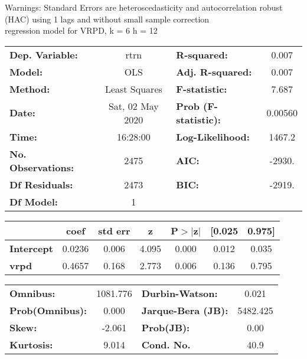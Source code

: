 Warnings: \newline
 [1] Standard Errors are heteroscedasticity and autocorrelation robust (HAC) using 1 lags and without small sample correction\\ 

regression model for VRPD, k = 6 h = 12\begin{center}
\begin{tabular}{lclc}
\toprule
\textbf{Dep. Variable:}    &       rtrn       & \textbf{  R-squared:         } &     0.007   \\
\textbf{Model:}            &       OLS        & \textbf{  Adj. R-squared:    } &     0.007   \\
\textbf{Method:}           &  Least Squares   & \textbf{  F-statistic:       } &     7.687   \\
\textbf{Date:}             & Sat, 02 May 2020 & \textbf{  Prob (F-statistic):} &  0.00560    \\
\textbf{Time:}             &     16:28:00     & \textbf{  Log-Likelihood:    } &    1467.2   \\
\textbf{No. Observations:} &        2475      & \textbf{  AIC:               } &    -2930.   \\
\textbf{Df Residuals:}     &        2473      & \textbf{  BIC:               } &    -2919.   \\
\textbf{Df Model:}         &           1      & \textbf{                     } &             \\
\bottomrule
\end{tabular}
\begin{tabular}{lcccccc}
                   & \textbf{coef} & \textbf{std err} & \textbf{z} & \textbf{P$> |$z$|$} & \textbf{[0.025} & \textbf{0.975]}  \\
\midrule
\textbf{Intercept} &       0.0236  &        0.006     &     4.095  &         0.000        &        0.012    &        0.035     \\
\textbf{vrpd}      &       0.4657  &        0.168     &     2.773  &         0.006        &        0.136    &        0.795     \\
\bottomrule
\end{tabular}
\begin{tabular}{lclc}
\textbf{Omnibus:}       & 1081.776 & \textbf{  Durbin-Watson:     } &    0.021  \\
\textbf{Prob(Omnibus):} &   0.000  & \textbf{  Jarque-Bera (JB):  } & 5482.425  \\
\textbf{Skew:}          &  -2.061  & \textbf{  Prob(JB):          } &     0.00  \\
\textbf{Kurtosis:}      &   9.014  & \textbf{  Cond. No.          } &     40.9  \\
\bottomrule
\end{tabular}
\end{center}

